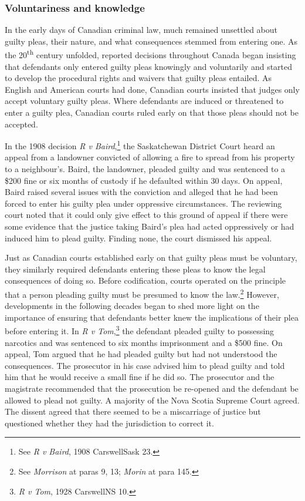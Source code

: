 \subsubsection{Voluntariness and knowledge}

In the early days of Canadian criminal law, much remained unsettled about guilty pleas, their nature, and what consequences stemmed from entering one. As the 20\textsuperscript{th} century unfolded, reported decisions throughout Canada began insisting that defendants only entered guilty pleas knowingly and voluntarily and started to develop the procedural rights and waivers that guilty pleas entailed. As English and American courts had done, Canadian courts insisted that judges only accept voluntary guilty pleas. Where defendants are induced or threatened to enter a guilty plea, Canadian courts ruled early on that those pleas should not be accepted. 

In the 1908 decision \textit{R v Baird},\footnote{See \textit{R v Baird}, 1908 CarswellSask 23.} the Saskatchewan District Court heard an appeal from a landowner convicted of allowing a fire to spread from his property to a neighbour's. Baird, the landowner, pleaded guilty and was sentenced to a \$200 fine or six months of custody if he defaulted within 30 days. On appeal, Baird raised several issues with the conviction and alleged that he had been forced to enter his guilty plea under oppressive circumstances. The reviewing court noted that it could only give effect to this ground of appeal if there were some evidence that the justice taking Baird's plea had acted oppressively or had induced him to plead guilty. Finding none, the court dismissed his appeal. 

Just as Canadian courts established early on that guilty pleas must be voluntary, they similarly required defendants entering these pleas to know the legal consequences of doing so. Before codification, courts operated on the principle that a person pleading guilty must be presumed to know the law.\footnote{See \textit{Morrison} at paras 9, 13; \textit{Morin} at para 145.} However, developments in the following decades began to shed more light on the importance of ensuring that defendants better knew the implications of their plea before entering it. In \textit{R v Tom},\footnote{\textit{R v Tom}, 1928 CarswellNS 10.} the defendant pleaded guilty to possessing narcotics and was sentenced to six months imprisonment and a \$500 fine. On appeal, Tom argued that he had pleaded guilty but had not understood the consequences. The prosecutor in his case advised him to plead guilty and told him that he would receive a small fine if he did so. The prosecutor and the magistrate recommended that the prosecution be re-opened and the defendant be allowed to plead not guilty. A majority of the Nova Scotia Supreme Court agreed. The dissent agreed that there seemed to be a miscarriage of justice but questioned whether they had the jurisdiction to correct it.


